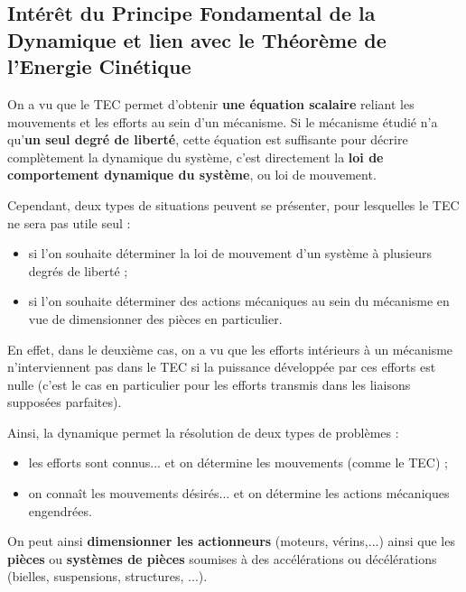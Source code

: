 \documentclass[11pt]{article}
\begin{document}
\subsection{Intérêt du Principe Fondamental de la Dynamique et lien avec le Théorème de l'Energie Cinétique}

On a vu que le TEC permet d'obtenir \textbf{une équation scalaire} reliant les mouvements et les efforts au sein d'un mécanisme. Si le mécanisme étudié n'a qu'\textbf{un seul degré de liberté}, cette équation est suffisante pour décrire complètement la dynamique du système, c'est directement la \textbf{loi de comportement dynamique du système}, ou loi de mouvement.


Cependant, deux types de situations peuvent se présenter, pour lesquelles le TEC ne sera pas utile seul :
\begin{itemize}
\item si l'on souhaite déterminer la loi de mouvement d'un système à plusieurs degrés de liberté ;
\item si l'on souhaite déterminer des actions mécaniques au sein du mécanisme en vue de dimensionner des pièces en particulier.
\end{itemize}

En effet, dans le deuxième cas, on a vu que les efforts intérieurs à un mécanisme n'interviennent pas dans le TEC si la puissance développée par ces efforts est nulle (c'est le cas en particulier pour les efforts transmis dans les liaisons supposées parfaites).

\noindent Ainsi, la dynamique permet la résolution de deux types de problèmes :
\begin{itemize}
\item les efforts sont connus... et on détermine les mouvements (comme le TEC) ;
\item on connaît les mouvements désirés... et on détermine les actions mécaniques engendrées.
\end{itemize}

On peut ainsi \textbf{dimensionner les actionneurs} (moteurs, vérins,...) ainsi que les \textbf{pièces} ou \textbf{systèmes de pièces} soumises à des accélérations ou décélérations (bielles, suspensions, structures, ...).
\end{document}
